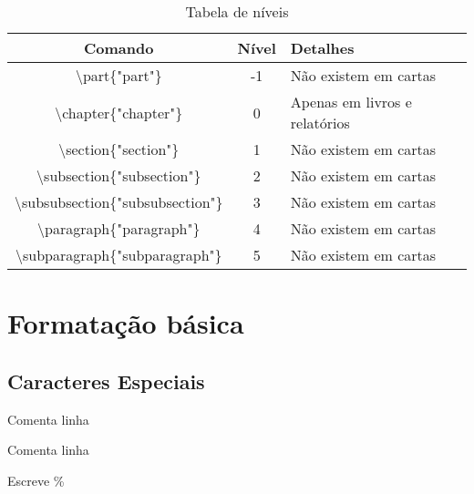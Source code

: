 \begin{frame}
	\begin{table}[h]
	\begin{center}
	\begin{tabular}{|c|c|p{4cm}|}
		\hline
		\textbf{Comando} & \textbf{Nível} & \textbf{Detalhes} \\ \hline
		\textbackslash part\{"part"\} & -1 & Não existem em cartas \\ \hline
		\textbackslash chapter\{"chapter"\} & 0 & Apenas em livros e relatórios \\ \hline
		\textbackslash section\{"section"\} & 1 & Não existem em cartas \\ \hline
		\textbackslash subsection\{"subsection"\} & 2 & Não existem em cartas \\ \hline
		\textbackslash subsubsection\{"subsubsection"\} & 3 & Não existem em cartas \\ \hline
		\textbackslash paragraph\{"paragraph"\} & 4 & Não existem em cartas \\ \hline
		\textbackslash subparagraph\{"subparagraph"\} & 5 & Não existem em cartas \\ \hline
	\end{tabular}
	\end{center}
	\caption{Tabela de níveis}
	\label{}
	\end{table}
\end{frame}

\section{Formatação básica} %

\subsection*{Caracteres Especiais} %
\label{sub:caracteres_especiais}

\label{sub:formata_o_b_sica}
\begin{frame}
	\begin{description}[maiortextodomundoqueconsigoes]
		\item [{\code \%}]    Comenta linha
	\end{description}
\end{frame}

\begin{frame}
	\begin{description}[maiortextodomundoqueconsigoes]
		\item [{\code \%}]    Comenta linha
		\item [{\code \textbackslash \%}]    Escreve \%
	\end{description}
\end{frame}

